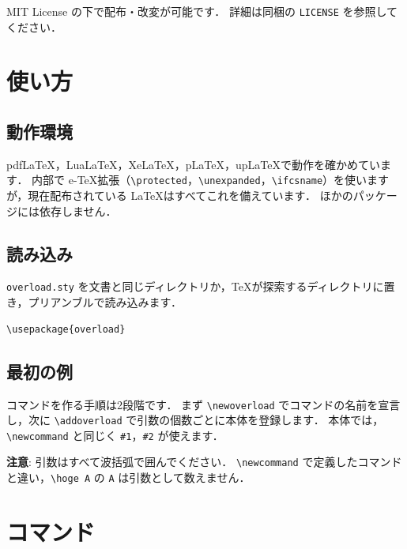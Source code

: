 \documentclass[lualatex,ja = standard,a4paper,11pt]{bxjsarticle}
\begin{document}
MIT License の下で配布・改変が可能です．
詳細は同梱の \texttt{LICENSE} を参照してください．

\section{使い方}

\subsection{動作環境}

pdf\LaTeX，Lua\LaTeX，Xe\LaTeX，p\LaTeX，up\LaTeX で動作を確かめています．
内部で e-\TeX 拡張（\verb|\protected|，\verb|\unexpanded|，\verb|\ifcsname|）を使いますが，現在配布されている \LaTeX はすべてこれを備えています．
ほかのパッケージには依存しません．

\subsection{読み込み}

\texttt{overload.sty} を文書と同じディレクトリか，\TeX が探索するディレクトリに置き，プリアンブルで読み込みます．

\begin{lstlisting}
\usepackage{overload}
\end{lstlisting}

\subsection{最初の例}

コマンドを作る手順は2段階です．
まず \verb|\newoverload| でコマンドの名前を宣言し，次に \verb|\addoverload| で引数の個数ごとに本体を登録します．
本体では，\verb|\newcommand| と同じく \verb|#1|，\verb|#2| が使えます．

\begin{example}
\newoverload{\hoge}

\hoge


\end{example}

\textbf{注意}: 引数はすべて波括弧で囲んでください．
\verb|\newcommand| で定義したコマンドと違い，\verb|\hoge A| の \verb|A| は引数として数えません．

\section{コマンド}
\end{document}
